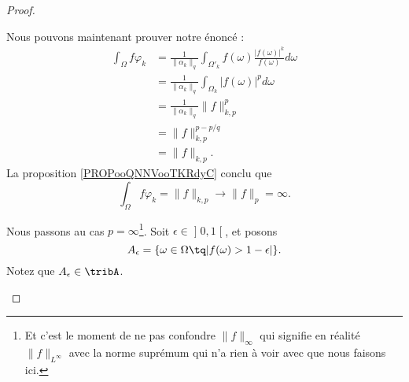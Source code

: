 \begin{proof}
\begin{subproof}
		Nous pouvons maintenant prouver notre énoncé :
		\begin{subequations}
			\begin{align}
				\int_{\Omega}f\varphi_k & =\frac{1}{ \| \alpha_k \|_q}\int_{\Omega'_k}f(\omega)\frac{ | f(\omega) |^k }{ f(\omega) }d\omega \\
				                        & = \frac{1}{ \| \alpha_k \|_q}\int_{\Omega_k}| f(\omega) |^pd\omega                                \\
				                        & =\frac{1}{ \| \alpha_k \|_q}\| f \|^p_{k,p}                                                       \\
				                        & =\| f \|_{k,p}^{p-p/q}                                                                            \\
				                        & =\| f \|_{k,p}.
			\end{align}
		\end{subequations}
		La proposition \ref{PROPooQNNVooTKRdyC} conclu que
		\begin{equation}
			\int_{\Omega}f\varphi_k=\| f \|_{k,p}\to \| f \|_p=\infty.
		\end{equation}

		\spitem[Pour \ref{ITEMooBZXAooAfgWvF}, avec \( p=\infty\)]
		Nous passons au cas \( p=\infty\)\footnote{Et c'est le moment de ne pas confondre \( \| f \|_{\infty}\) qui signifie en réalité \( \| f \|_{L^{\infty}}\) avec la norme suprémum qui n'a rien à voir avec que nous faisons ici.}. Soit \( \epsilon\in\mathopen] 0,1\mathclose[\), et posons
		\begin{equation}
			A_{\epsilon}=\{ \omega\in\Omega\tq | f(\omega)>1-\epsilon | \}.
		\end{equation}
		Notez que \( A_{\epsilon}\in\tribA\).


\end{subproof}
\end{proof}
